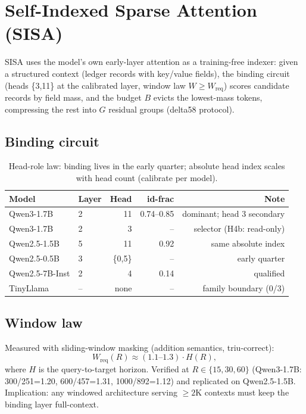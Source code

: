 \documentclass[11pt]{article}
\newcommand{\sisa}{SISA}
\begin{document}
\section{Self-Indexed Sparse Attention (SISA)}
\label{sec:sisa}
\sisa{} uses the model's own early-layer attention as a training-free
indexer: given a structured context (ledger records with key/value fields),
the binding circuit (heads \{3,11\} at the calibrated layer, window law
$W \ge W_{\mathrm{req}}$) scores candidate records by field mass, and the
budget $B$ evicts the lowest-mass tokens, compressing the rest into
$G$ residual groups (delta58 protocol).

\subsection{Binding circuit}
\begin{table}[H]\centering\small
\begin{tabular}{llrrr}
\toprule
Model & Layer & Head & id-frac & Note \\
\midrule
Qwen3-1.7B & 2 & 11 & 0.74--0.85 & dominant; head 3 secondary \\
Qwen3-1.7B & 2 & 3 & -- & selector (H4b: read-only) \\
Qwen2.5-1.5B & 5 & 11 & 0.92 & same absolute index \\
Qwen2.5-0.5B & 3 & \{0,5\} & -- & early quarter \\
Qwen2.5-7B-Inst & 2 & 4 & 0.14 & qualified \\
TinyLlama & -- & none & -- & family boundary (0/3) \\
\bottomrule
\end{tabular}
\caption{Head-role law: binding lives in the early quarter; absolute head
index scales with head count (calibrate per model).}
\end{table}

\subsection{Window law}
Measured with sliding-window masking (addition semantics, triu-correct):
\begin{equation}
W_{\mathrm{req}}(R) \approx (1.1\text{--}1.3) \cdot H(R),
\label{eq:windowlaw}
\end{equation}
where $H$ is the query-to-target horizon. Verified at $R \in \{15,30,60\}$
(Qwen3-1.7B: 300/251=1.20, 600/457=1.31, 1000/892=1.12) and replicated on
Qwen2.5-1.5B. Implication: any windowed architecture serving $\ge 2$K
contexts must keep the binding layer full-context.
\end{document}

